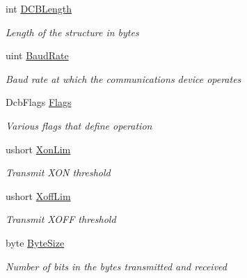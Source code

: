 \begin{DoxyCompactItemize}
\item 
int \mbox{\hyperlink{struct_r_j_c_p_1_1_i_o_1_1_ports_1_1_native_1_1_windows_1_1_native_methods_1_1_d_c_b_a1c12b171ab6904c2d2e6e06a0b8e48ad}{D\+C\+B\+Length}}
\begin{DoxyCompactList}\small\item\em Length of the structure in bytes \end{DoxyCompactList}\item 
uint \mbox{\hyperlink{struct_r_j_c_p_1_1_i_o_1_1_ports_1_1_native_1_1_windows_1_1_native_methods_1_1_d_c_b_ae73cb845dfe6195c30571163141d7cdf}{Baud\+Rate}}
\begin{DoxyCompactList}\small\item\em Baud rate at which the communications device operates \end{DoxyCompactList}\item 
Dcb\+Flags \mbox{\hyperlink{struct_r_j_c_p_1_1_i_o_1_1_ports_1_1_native_1_1_windows_1_1_native_methods_1_1_d_c_b_a2b979e54e0ac06f594589755a71f9980}{Flags}}
\begin{DoxyCompactList}\small\item\em Various flags that define operation \end{DoxyCompactList}\item 
ushort \mbox{\hyperlink{struct_r_j_c_p_1_1_i_o_1_1_ports_1_1_native_1_1_windows_1_1_native_methods_1_1_d_c_b_a89862e94bf704380cc871e988cc93a71}{Xon\+Lim}}
\begin{DoxyCompactList}\small\item\em Transmit X\+ON threshold \end{DoxyCompactList}\item 
ushort \mbox{\hyperlink{struct_r_j_c_p_1_1_i_o_1_1_ports_1_1_native_1_1_windows_1_1_native_methods_1_1_d_c_b_a5ba15112c1a3332e5c2ca0d2efab41f3}{Xoff\+Lim}}
\begin{DoxyCompactList}\small\item\em Transmit X\+O\+FF threshold \end{DoxyCompactList}\item 
byte \mbox{\hyperlink{struct_r_j_c_p_1_1_i_o_1_1_ports_1_1_native_1_1_windows_1_1_native_methods_1_1_d_c_b_a0d6b327ac65a5fa8720e78c83c726bbd}{Byte\+Size}}
\begin{DoxyCompactList}\small\item\em Number of bits in the bytes transmitted and received \end{DoxyCompactList}\item 

\end{DoxyCompactItemize}
